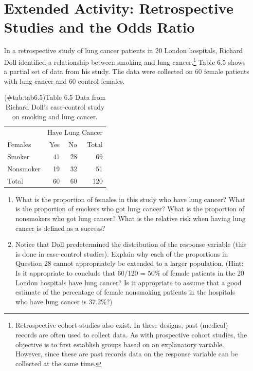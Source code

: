 \documentclass[
]{report}
\providecommand{\tightlist}{%
  \setlength{\itemsep}{0pt}\setlength{\parskip}{0pt}}
\begin{document}
\section*{Extended Activity: Retrospective Studies and the Odds Ratio}\label{extended-activity-retrospective-studies-and-the-odds-ratio}

In a retrospective study of lung cancer patients in 20 London hospitals, Richard Doll identified a relationship between smoking and lung cancer.\footnote{Retrospective cohort studies also exist. In these designs, past (medical) records are often used to collect data. As with prospective cohort studies, the objective is to first establish groups based on an explanatory variable. However, since these are past records data on the response variable can be collected at the same time.} Table 6.5 shows a partial set of data from his study. The data were collected on 60 female patients with lung cancer and 60 control females.

\begin{table}[!h]
\centering
\caption{(\#tab:tab6.5)Table 6.5 Data from Richard Doll’s case‐control study on smoking and lung cancer.}
\centering
\begin{tabular}[t]{lrrr}
\toprule
\multicolumn{1}{c}{ } & \multicolumn{3}{c}{Have Lung Cancer} \\
\cmidrule(l{3pt}r{3pt}){2-4}
Females & Yes & No & Total\\
\midrule
Smoker & 41 & 28 & 69\\
Nonsmoker & 19 & 32 & 51\\
Total & 60 & 60 & 120\\
\bottomrule
\end{tabular}
\end{table}

\begin{enumerate}
\def\labelenumi{\arabic{enumi}.}
\setcounter{enumi}{27}
\tightlist
\item
  What is the proportion of females in this study who have lung cancer? What is the proportion of smokers who got lung cancer? What is the proportion of nonsmokers who got lung cancer? What is the relative risk when having lung cancer is defined as a success?\\
\item
  Notice that Doll predetermined the distribution of the response variable (this is done in case‑control studies). Explain why each of the proportions in Question 28 cannot appropriately be extended to a larger population. (Hint: Is it appropriate to conclude that 60/120 = 50\% of female patients in the 20 London hospitals have lung cancer? Is it appropriate to assume that a good estimate of the percentage of female nonsmoking patients in the hospitals who have lung cancer is 37.2\%?)
\end{enumerate}
\end{document}
